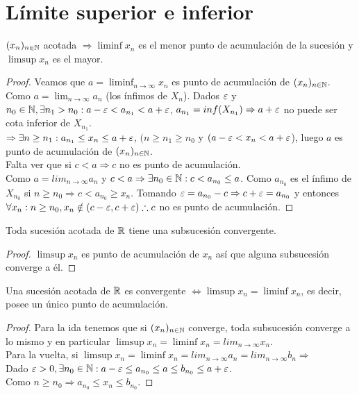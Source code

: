 \section{Límite superior e inferior}

\begin{theorem}
  $(x_n)_{n \in \mathbb{N}}$ acotada $\Rightarrow \liminf x_n$ es el menor punto de acumulación de la sucesión y $\limsup x_n$ es el mayor.

  \begin{proof}
    Veamos que $a = \liminf_{n \to \infty} x_n$ es punto de acumulación de $(x_n)_{n \in \mathbb{N}}$. \\
    Como $a = \lim_{n \to \infty} a_n$ (los ínfimos de $X_n$). Dados $\varepsilon$ y $n_0 \in \mathbb{N}, \exists n_1 > n_0 : a-\varepsilon < a_{n_1} < a+\varepsilon$, $a_{n_1} = inf(X_{n_1}) \Rightarrow a + \varepsilon$ no puede ser cota inferior de $X_{n_1}$. \\
    $\Rightarrow \exists n \geq n_1 : a_{n_1} \leq x_n \leq a+\varepsilon$, $(n \geq n_1 \geq n_0$ y $(a - \varepsilon < x_n < a + \varepsilon$), luego $a$ es punto de acumulación de $(x_n)_{n \in \mathbb{N}}$. \\
    Falta ver que si $c < a \Rightarrow c$ no es punto de acumulación. \\
    Como $a = lim_{n \to \infty} a_n$ y $c < a \Rightarrow \exists n_0 \in \mathbb{N} : c < a_{n_0} \leq a$. Como $a_{n_0}$ es el ínfimo de $X_{n_0}$ si $n \geq n_0 \Rightarrow c < a_{n_0} \geq x_n$. Tomando $\varepsilon = a_{n_0} - c \Rightarrow c+\varepsilon = a_{n_0}$ y entonces $\forall x_n: n \geq n_0, x_n \notin (c - \varepsilon, c + \varepsilon) \therefore c$ no es punto de acumulación.  
  \end{proof}
\end{theorem}

\begin{theorem}
  Toda sucesión acotada de $\mathbb{R}$ tiene una subsucesión convergente.
  \begin{proof}
    $\limsup x_n$ es punto de acumulación de $x_n$ así que alguna subsucesión converge a él.
  \end{proof}
\end{theorem}

\begin{corollary}
  Una sucesión acotada de $\mathbb{R}$ es convergente $\iff \limsup x_n = \liminf x_n$, es decir, posee un único punto de acumulación.
  \begin{proof}
    Para la ida tenemos que si $(x_n)_{n \in \mathbb{N}}$ converge, toda subsucesión converge a lo mismo y en particular $\limsup x_n = \liminf x_n = lim_{n \to \infty} x_n$. \\
    Para la vuelta, si $\limsup x_n = \liminf x_n = lim_{n \to \infty} a_n = lim_{n \to \infty} b_n \Rightarrow$ \\
    Dado $\varepsilon > 0, \exists n_0 \in \mathbb{N} : a - \varepsilon \leq a_{n_0} \leq a \leq b_{n_0} \leq a + \varepsilon$. \\
    Como $n \geq n_0 \Rightarrow a_{n_0} \leq x_n \leq b_{n_0}$.
  \end{proof}
\end{corollary}

